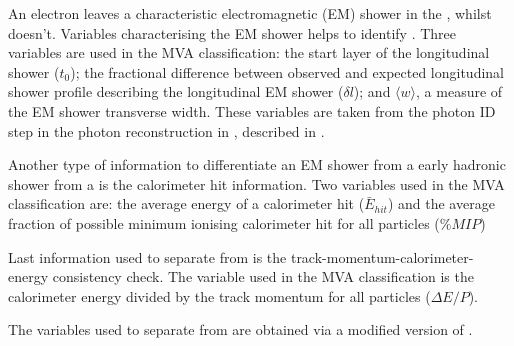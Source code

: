 An electron leaves a characteristic electromagnetic  (EM) shower in the \ECAL, whilst \Pgpm doesn't. Variables characterising the  EM shower helps to identify \Pem. Three variables are used in the MVA classification: the start layer of the longitudinal shower ($t_0$); the fractional difference between observed and expected longitudinal shower profile describing the longitudinal EM shower ($\delta{l}$); and $\langle{w}\rangle$, a measure of the EM shower transverse width. These variables are  taken from the photon ID step in the photon reconstruction in \pandora, described in .

Another type of information to differentiate an EM shower from a early hadronic shower from a \Pgpm is the calorimeter hit information. Two variables used in the MVA classification are: the average energy of a calorimeter hit ($\bar{E}_{hit}$) and the average fraction of possible minimum ionising calorimeter hit for all particles ($\%MIP$)

Last information used to separate \Pem from \Pgpm is the track-momentum-calorimeter-energy consistency check. The variable used in the MVA classification is the calorimeter energy divided by the track momentum for all particles ($\Delta E/P$).

The variables used to separate \Pem from \Pgpm  are obtained via a modified version of \pandora.






